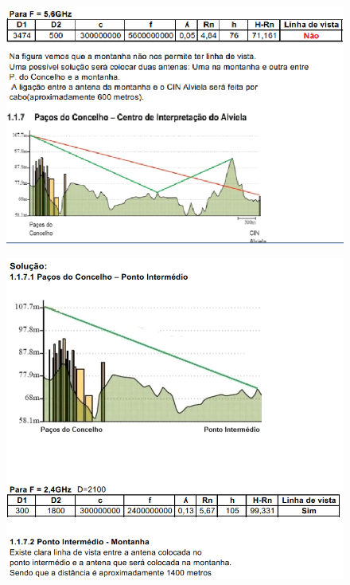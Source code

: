 \documentclass[a4paper,titlepage]{article}
\begin{document}
		\begin{figure}[H]
											\centering
											\includegraphics[width=\linewidth]{Img5_2.png}
		\end{figure}
		\begin{figure}[H]
											\centering
											\includegraphics[width=\linewidth]{Img6.png}
		\end{figure}
\end{document}
